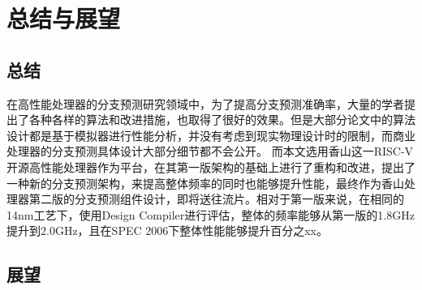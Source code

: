 
\chapter{总结与展望}

\section{总结}

在高性能处理器的分支预测研究领域中，为了提高分支预测准确率，大量的学者提出了各种各样的算法和改进措施，也取得了很好的效果。但是大部分论文中的算法设计都是基于模拟器进行性能分析，并没有考虑到现实物理设计时的限制，而商业处理器的分支预测具体设计大部分细节都不会公开。
而本文选用香山这一RISC-V开源高性能处理器作为平台，在其第一版架构的基础上进行了重构和改进，提出了一种新的分支预测架构，来提高整体频率的同时也能够提升性能，最终作为香山处理器第二版的分支预测组件设计，即将送往流片。相对于第一版来说，在相同的14nm工艺下，使用Design Compiler进行评估，整体的频率能够从第一版的1.8GHz提升到2.0GHz，且在SPEC 2006下整体性能能够提升百分之xx。

\section{展望}


